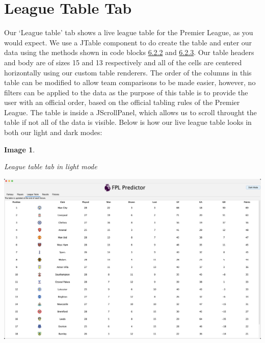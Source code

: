 \documentclass[12pt, a4paper, oneside]{book}
\newtheorem{image}[theorem]{Image}
\numberwithin{equation}{section}
\begin{document}
\section{League Table Tab}\label{sec:6.7}

Our `League table' tab shows a live league table for the Premier League, as you would expect. We use a JTable component to do create the table and enter our data using the methods shown in code blocks \hyperref[Defining a DefaultTableModel]{6.2.2} and \hyperref[Creating a DataTable object]{6.2.3}. Our table headers and body are of sizes 15 and 13 respectively and all of the cells are centered horizontally using our custom table renderers. The order of the columns in this table can be modified to allow team comparisons to be made easier, however, no filters can be applied to the data as the purpose of this table is to provide the user with an official order, based on the official tabling rules of the Premier League. The table is inside a JScrollPanel, which allows us to scroll throught the table if not all of the data is visible. Below is how our live league table looks in both our light and dark modes:

\begin{image} \label{League table tab in light mode}

  League table tab in light mode

  \vspace{0.5cm}

  \centerline{\includegraphics[width=1\textwidth]{images/gui/league-table-tab/light.png}}

\end{image}
\end{document}
